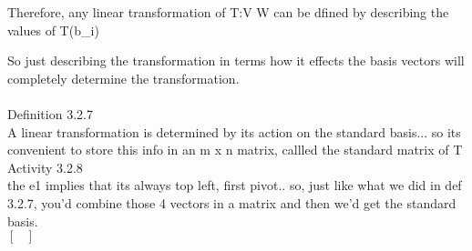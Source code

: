 \documentclass{article}
\begin{document}
Therefore, any linear transformation of T:V W can be dfined by describing the values of T(b_{i})

So just describing the transformation in terms how it effects the basis vectors will completely determine the transformation.\\
\\
Definition 3.2.7 \\
A linear transformation is determined by its action on the standard basis... so its convenient to store this info in an m x n matrix, callled the standard matrix of T\\
Activity 3.2.8\\
the e1 implies that its always top left, first pivot.. so, just like what we did in def 3.2.7, you'd combine those 4 vectors in a matrix and then we'd get the standard basis.\\

$\left[ 
\begin{matrix}

\end{matrix}
\right]$
\end{document}
